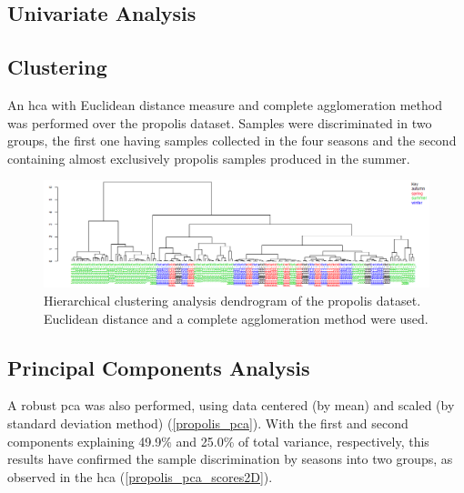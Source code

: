 \subsection{Univariate Analysis}





\subsection{Clustering}

An \acrlong{hca} with Euclidean distance measure and complete agglomeration method was performed over the propolis dataset. Samples were discriminated in two groups, the first one having samples collected in the four seasons and the second containing almost exclusively propolis samples produced in the summer.

\begin{figure}[h]
	\centering
	\includegraphics[width=1\linewidth]{Imagens/Propolis/hca}
	\caption{Hierarchical clustering analysis dendrogram of the propolis dataset. Euclidean distance and a complete agglomeration method were used.}
	\label{propolis_hca}
\end{figure}


\subsection{Principal Components Analysis}

A robust \gls{pca} was also performed, using data centered (by mean) and scaled (by standard deviation method) (\autoref{propolis_pca}). With the first and second components explaining 49.9\% and 25.0\% of total variance, respectively, this results have confirmed the sample discrimination by seasons into two groups, as observed in the \gls{hca} (\autoref{propolis_pca_scores2D}).

